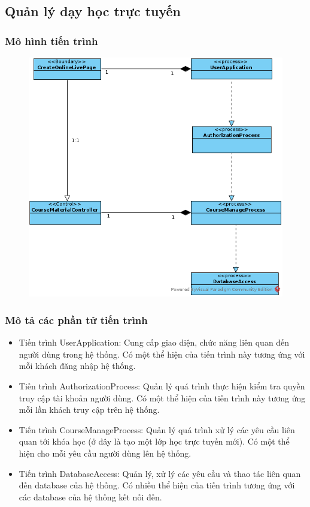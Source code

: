 \documentclass[./../main.tex]{subfiles}
\begin{document}
\subsection{Quản lý dạy học trực tuyến}

\subsubsection{Mô hình tiến trình}

\begin{figure}[H]
	\centering
	\includegraphics[width=\linewidth]{./images/pv_create_online_live.png}
\end{figure}

\subsubsection{Mô tả các phần tử tiến trình}
\begin{itemize}
	\item Tiến trình UserApplication: Cung cấp giao diện, chức năng liên quan đến người dùng trong hệ thống. Có một thể hiện của tiến trình này tương ứng với mỗi khách đăng nhập hệ thống.
	\item Tiến trình AuthorizationProcess: Quản lý quá trình thực hiện kiểm tra quyền truy cập tài khoản người dùng.
	Có một thể hiện của tiến trình này tương ứng mỗi lần khách truy cập trên hệ thống.
\item Tiến trình CourseManageProcess: Quản lý quá trình xử lý các yêu cầu liên quan tới khóa học (ở đây là tạo một lớp học trực tuyến mới).
	Có một thể hiện cho mỗi yêu cầu người dùng lên hệ thống.
	\item Tiến trình DatabaseAccess: Quản lý, xử lý các yêu cầu và thao tác liên quan đến  database của hệ thống. Có nhiều thể hiện của tiến trình tương ứng với các database của hệ thống kết nối đến.
\end{itemize}
\end{document}
